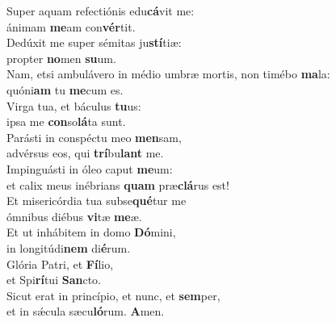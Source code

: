 \evenverse Super aquam refectiónis edu\textbf{cá}vit me:~\*\\
\evenverse ánimam \textbf{me}am con\textbf{vér}tit.\\
\oddverse Dedúxit me super sémitas ju\textbf{stí}tiæ:~\*\\
\oddverse propter \textbf{no}men \textbf{su}um.\\
\evenverse Nam, etsi ambulávero in médio umbræ mortis, non timébo \textbf{ma}la:~\*\\
\evenverse quóni\textbf{am} tu \textbf{me}cum es.\\
\oddverse Virga tua, et báculus \textbf{tu}us:~\*\\
\oddverse ipsa me \textbf{con}so\textbf{lá}ta sunt.\\
\evenverse Parásti in conspéctu meo \textbf{men}sam,~\*\\
\evenverse advérsus eos, qui \textbf{trí}bu\textbf{lant} me.\\
\oddverse Impinguásti in óleo caput \textbf{me}um:~\*\\
\oddverse et calix meus inébrians \textbf{quam} præ\textbf{clá}rus est!\\
\evenverse Et misericórdia tua subse\textbf{qué}tur me~\*\\
\evenverse ómnibus diébus \textbf{vi}tæ \textbf{me}æ.\\
\oddverse Et ut inhábitem in domo \textbf{Dó}mini,~\*\\
\oddverse in longitúdi\textbf{nem} di\textbf{é}rum.\\
\evenverse Glória Patri, et \textbf{Fí}lio,~\*\\
\evenverse et Spi\textbf{rí}tui \textbf{San}cto.\\
\oddverse Sicut erat in princípio, et nunc, et \textbf{sem}per,~\*\\
\oddverse et in sǽcula sæcu\textbf{ló}rum. \textbf{A}men.\\
